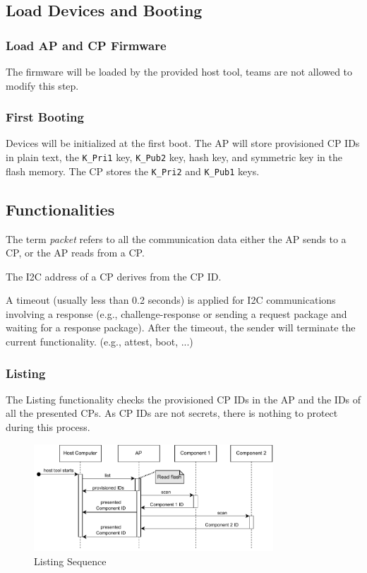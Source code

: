 \documentclass[11pt,oneside,onecolumn,letterpaper]{article}
\begin{document}
	\subsection{Load Devices and Booting}
	\subsubsection{Load AP and CP Firmware}
	The firmware will be loaded by the provided host tool,
	teams are not allowed to modify this step.
	
	\subsubsection{First Booting}
	Devices will be initialized at the first boot.
	The AP will store provisioned CP IDs in plain text,
	the \texttt{K\_Pri1} key,
	\texttt{K\_Pub2} key,
	hash key,
	and symmetric key in the flash memory.
	The CP stores the \texttt{K\_Pri2} and \texttt{K\_Pub1} keys.
	
	\subsection{Functionalities}
	The term \textit{packet} refers to all the communication data either the AP sends to a CP,
	or the AP reads from a CP.
	
	The I2C address of a CP derives from the CP ID.
	
	A timeout (usually less than 0.2 seconds) is applied for I2C communications involving a response (e.g., challenge-response or sending a request package and waiting for a response package).
	After the timeout,
	the sender will terminate the current functionality. (e.g., attest, boot, ...)
	
	\subsubsection{Listing}
	The Listing functionality checks the provisioned CP IDs in the AP and the IDs of all the presented CPs.
	As CP IDs are not secrets,
	there is nothing to protect during this process.
	
	\begin{figure}[h]
		\centering
		\includegraphics[width=0.8\textwidth]{pics/list.pdf}
		\caption{Listing Sequence}
		\label{fig:functionality_list}
	\end{figure}
	
\end{document}
